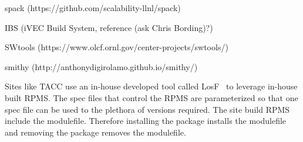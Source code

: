spack (https://github.com/scalability-llnl/spack)

IBS (iVEC Build System, reference (ask Chris Bording)?)

SWtools (https://www.olcf.ornl.gov/center-projects/swtools/)

smithy (http://anthonydigirolamo.github.io/smithy/)

Sites like TACC use an in-house developed tool called
LosF~\cite{lmodSC11} to leverage in-house  built RPMS.  The spec files
that control the RPMS are parameterized so that one spec file can be
used to the plethora of versions required.  The site build RPMS
include the modulefile.  Therefore installing the package installs the
modulefile and removing the package removes the modulefile.
